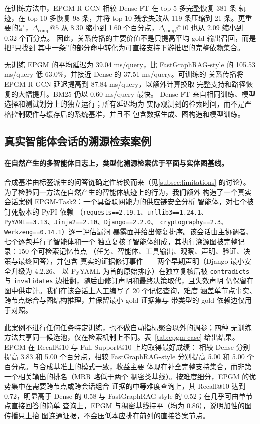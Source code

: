 在训练方法中，EPGM R-GCN 相较 Dense-FT 在 top-5 多完整恢复 381 条
轨迹，在 top-10 多恢复 98 条，并将 top-10 残余失败从 119 条压缩到
21 条。更重要的是，$\Delta_{\mathrm{comp}}@5$ 从 8.30 缩小到 1.60
个百分点，$\Delta_{\mathrm{comp}}@10$ 也从 2.09 缩小到 0.32 个百分点。
因此，关系传播的主要价值不是只提高平均 gold 输出召回，而是把“只找到
其中一条”的部分命中转化为可直接支持下游推理的完整依赖集合。

无训练 EPGM 的平均延迟为 39.04 ms/query，比 FastGraphRAG-style 的
105.53 ms/query 低 63.0\%，并接近 Dense 的 37.51 ms/query。可训练的
关系传播将 EPGM R-GCN 延迟提高到 87.84 ms/query，以额外计算换取
完整支持和路径恢复的大幅提升。BM25 仍以 0.60 ms/query 最快。
Dense-FT 来自相同训练、模型选择和测试划分上的独立运行；所有延迟均为
实际观测到的检索时间，而不是严格控制硬件与缓存后的系统基准，并且不
包含数据生成、图构造和模型训练。

\subsection{真实智能体会话的溯源检索案例}

\paragraph{在自然产生的多智能体日志上，类型化溯源检索优于平面与实体图基线。}
合成基准由标签派生的问答链确定性转换而来（见\ref{subsec:limitations}
的讨论）。为了检验同一方法在自然产生的智能体轨迹上的行为，我们额外
构造了一个真实会话案例 EPGM-Task2：一个具备联网能力的供应链安全分析
智能体，对七个被钉死版本的 PyPI 依赖
（\texttt{requests==2.19.1}、\texttt{urllib3==1.24.1}、
\texttt{PyYAML==3.13}、\texttt{Jinja2==2.10}、\texttt{Django==2.2.0}、
\texttt{cryptography==2.3}、\texttt{Werkzeug==0.14.1}）逐一评估漏洞
暴露面并给出修复排序。该会话由主协调者、七个逐包并行子智能体和一个
独立复核子智能体组成，其执行溯源图被完整记录：150 个可检索记忆节点
（任务、智能体、工具输出、观察、声明、验证、决策与最终回答），并包含
真实的证据修订事件——两个早期声明（Django 最小安全升级为 4.2.26、
以 PyYAML 为首的原始排序）在独立复核后被 \texttt{contradicts} 与
\texttt{invalidates} 边推翻，随后由修订声明和最终决策取代，且失效声明
仍保留在图中供审计。我们在该会话上人工编写了 20 个记忆查询，难度
涵盖单节点事实、跨节点综合与图结构推理，并保留最小 gold 证据集与
带类型的 gold 依赖边仅用于对照。

此案例不进行任何任务特定训练，也不做自动指标聚合以外的调参；四种
无训练方法共享同一候选池，仅在检索机制上不同。表~\ref{tab:epgm-case}
给出结果。EPGM 在 Recall@10 与 Full Support@10 上均取得最好成绩：
相较 Dense 分别提高 3.83 和 5.00 个百分点，相较 FastGraphRAG-style
分别提高 5.00 和 5.00 个百分点。与合成基准上的模式一致，收益主要
体现在补全完整支持集合，而非第一个相关输出的排名（MRR 略低于两个
稠密类基线）。按难度细分，EPGM 的优势集中在需要跨节点或跨会话组合
证据的中等难度查询上，其 Recall@10 达到 0.72，明显高于 Dense 的
0.58 与 FastGraphRAG-style 的 0.52；在几乎可由单节点直接回答的简单
查询上，EPGM 与稠密基线持平（均为 0.86），说明加性的图传播只上抬
图连通证据，不会压低本应排在前列的直接答案节点。

